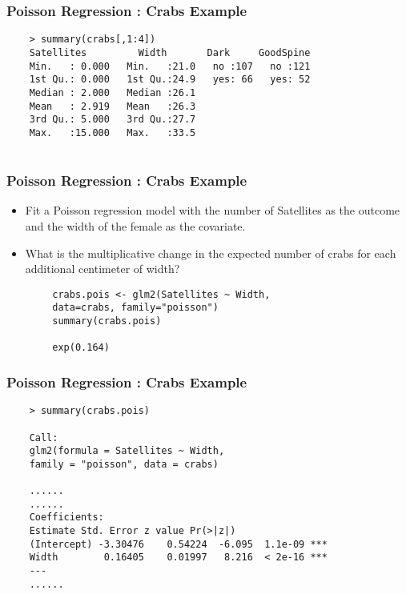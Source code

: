 \documentclass[MASTER.tex]{subfiles}
\begin{document}
\begin{frame}[fragile]
	\frametitle{Poisson Regression :  Crabs Example}
	\begin{verbatim}
	> summary(crabs[,1:4])
	Satellites         Width       Dark     GoodSpine
	Min.   : 0.000   Min.   :21.0   no :107   no :121  
	1st Qu.: 0.000   1st Qu.:24.9   yes: 66   yes: 52  
	Median : 2.000   Median :26.1                      
	Mean   : 2.919   Mean   :26.3                      
	3rd Qu.: 5.000   3rd Qu.:27.7                      
	Max.   :15.000   Max.   :33.5                
	
	\end{verbatim}
\end{frame}
\begin{frame}[fragile]
	\frametitle{Poisson Regression :  Crabs Example}
	\begin{itemize}
		\item Fit a Poisson regression model with the number of Satellites as the outcome and the width of the female as the covariate. 
		
		\item What is the multiplicative change in the expected number of crabs for each additional centimeter of width?
	\end{itemize}
	\begin{framed}
		\begin{verbatim}
		crabs.pois <- glm2(Satellites ~ Width, 
		data=crabs, family="poisson")
		summary(crabs.pois)
		
		exp(0.164)
		\end{verbatim}
	\end{framed}
	
\end{frame}
\begin{frame}[fragile]
	\frametitle{Poisson Regression :  Crabs Example}
	\begin{verbatim}
	> summary(crabs.pois)
	
	Call:
	glm2(formula = Satellites ~ Width, 
	family = "poisson", data = crabs)
	
	...... 
	......
	Coefficients:
	Estimate Std. Error z value Pr(>|z|)    
	(Intercept) -3.30476    0.54224  -6.095  1.1e-09 ***
	Width        0.16405    0.01997   8.216  < 2e-16 ***
	---
	...... 
	\end{verbatim}
	
\end{frame}
\end{document}

